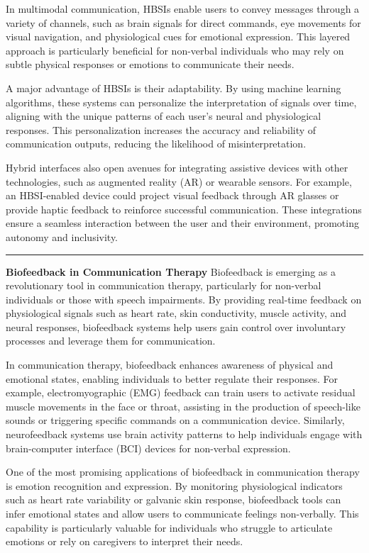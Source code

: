 \documentclass[12pt, research paper]{report}
\begin{document}
	\noindent In multimodal communication, HBSIs enable users to convey messages through a variety of channels, such as brain signals for direct commands, eye movements for visual navigation, and physiological cues for emotional expression. This layered approach is particularly beneficial for non-verbal individuals who may rely on subtle physical responses or emotions to communicate their needs.
	\bigskip 
	
	\noindent A major advantage of HBSIs is their adaptability. By using machine learning algorithms, these systems can personalize the interpretation of signals over time, aligning with the unique patterns of each user’s neural and physiological responses. This personalization increases the accuracy and reliability of communication outputs, reducing the likelihood of misinterpretation.
	\bigskip 
	
	\noindent Hybrid interfaces also open avenues for integrating assistive devices with other technologies, such as augmented reality (AR) or wearable sensors. For example, an HBSI-enabled device could project visual feedback through AR glasses or provide haptic feedback to reinforce successful communication. These integrations ensure a seamless interaction between the user and their environment, promoting autonomy and inclusivity.
	
	\noindent \rule{13.85cm}{0.01cm}
	\textbf{Biofeedback in Communication Therapy}
	\newline Biofeedback is emerging as a revolutionary tool in communication therapy, particularly for non-verbal individuals or those with speech impairments. By providing real-time feedback on physiological signals such as heart rate, skin conductivity, muscle activity, and neural responses, biofeedback systems help users gain control over involuntary processes and leverage them for communication.
	\bigskip 
	
	\noindent In communication therapy, biofeedback enhances awareness of physical and emotional states, enabling individuals to better regulate their responses. For example, electromyographic (EMG) feedback can train users to activate residual muscle movements in the face or throat, assisting in the production of speech-like sounds or triggering specific commands on a communication device. Similarly, neurofeedback systems use brain activity patterns to help individuals engage with brain-computer interface (BCI) devices for non-verbal expression.
	\bigskip 
	
	\noindent One of the most promising applications of biofeedback in communication therapy is emotion recognition and expression. By monitoring physiological indicators such as heart rate variability or galvanic skin response, biofeedback tools can infer emotional states and allow users to communicate feelings non-verbally. This capability is particularly valuable for individuals who struggle to articulate emotions or rely on caregivers to interpret their needs.
	\bigskip 
	
\end{document}
